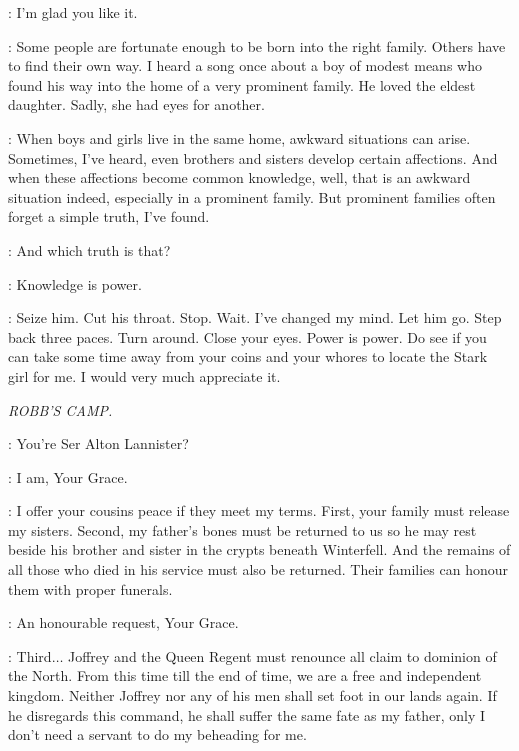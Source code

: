 \LITTLEFINGER: I'm glad you like it.

\CERSEI: Some people are fortunate enough to be born into the right family. Others have to find their own way. I heard a song once about a boy of modest means who found his way into the home of a very prominent family. He loved the eldest daughter. Sadly, she had eyes for another.

\LITTLEFINGER: When boys and girls live in the same home, awkward situations can arise. Sometimes, I've heard, even brothers and sisters develop certain affections. And when these affections become common knowledge, well, that is an awkward situation indeed, especially in a prominent family. But prominent families often forget a simple truth, I've found.

\CERSEI: And which truth is that?

\LITTLEFINGER: Knowledge is power.


\CERSEI: Seize him. Cut his throat. Stop. Wait. I've changed my mind. Let him go. Step back three paces. Turn around. Close your eyes. Power is power. Do see if you can take some time away from your coins and your whores to locate the Stark girl for me. I would very much appreciate it.

\scene

\newpage

\textit{ROBB'S CAMP.}


\ROBB: You're Ser Alton Lannister?

\ALTON: I am, Your Grace.

\ROBB: I offer your cousins peace if they meet my terms. First, your family must release my sisters. Second, my father's bones must be returned to us so he may rest beside his brother and sister in the crypts beneath Winterfell. And the remains of all those who died in his service must also be returned. Their families can honour them with proper funerals.

\ALTON: An honourable request, Your Grace.

\ROBB: Third$\ldots$ Joffrey and the Queen Regent must renounce all claim to dominion of the North. From this time till the end of time, we are a free and independent kingdom. Neither Joffrey nor any of his men shall set foot in our lands again. If he disregards this command, he shall suffer the same fate as my father, only I don't need a servant to do my beheading for me.

